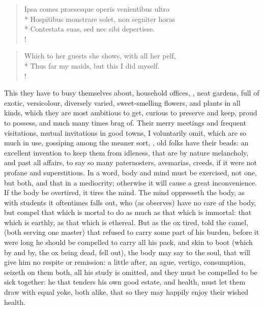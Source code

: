 {%
\begin{latin}%
\begin{verse}%
Ipsa comes praesesque operis venientibus ultro\\*
Hospitibus monstrare solet, non segniter horas\\*
Contestata suas, sed nec sibi depertisse.\\!
\end{verse}%
\end{latin}%
\translationrule%
\begin{verse}%
Which to her guests she shows, with all her pelf,\\*
Thus far my maids, but this I did myself.\\!
\end{verse}%
%
This they have to busy themselves about, household offices, \etc{}, 
neat gardens, full of exotic, versicolour, diversely varied,
sweet-smelling flowers, and plants in all kinds, which they are most
ambitious to get, curious to preserve and keep, proud to possess, and
much many times brag of. Their merry meetings and frequent visitations,
mutual invitations in good towns, I voluntarily omit, which are so much
in use, gossiping among the meaner sort, \etc{}, old folks have their
beads: an excellent invention to keep them from idleness, that are by
nature melancholy, and past all affairs, to say so many paternosters,
avemarias, creeds, if it were not profane and superstitious. In a word,
body and mind must be exercised, not one, but both, and that in a
mediocrity; otherwise it will cause a great inconvenience. If the body
be overtired, it tires the mind. The mind oppresseth the body, as with
students it oftentimes falls out, who (as \Plutarch observes) have
no care of the body, but compel that which is mortal to do as much as
that which is immortal: that which is earthly, as that which is
ethereal. But as the ox tired, told the camel, (both serving one
master) that refused to carry some part of his burden, before it were
long he should be compelled to carry all his pack, and skin to boot
(which by and by, the ox being dead, fell out), the body may say to the
soul, that will give him no respite or remission: a little after, an
ague, vertigo, consumption, seizeth on them both, all his study is
omitted, and they must be compelled to be sick together: he that
tenders his own good estate, and health, must let them draw with equal
yoke, both alike,  that so they may happily enjoy their wished
health.

}
